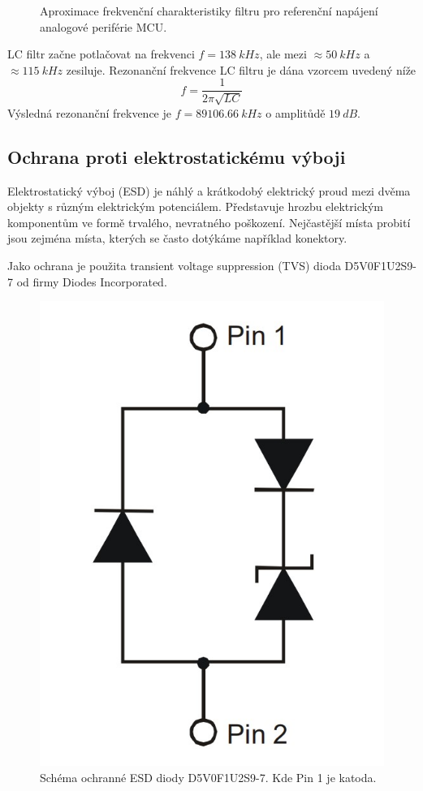 \begin{figure}[H]
    \caption{Aproximace frekvenční charakteristiky filtru pro referenční napájení analogové periférie MCU.}
    \label{fig:stm32_vref_response}
\end{figure}
LC filtr začne potlačovat na frekvenci $f = 138 \ kHz$, ale mezi $\approx 50 \ kHz$ a $ \approx 115 \ kHz$ zesiluje.
Rezonanční frekvence LC filtru je dána vzorcem uvedený níže
\begin{equation}
    f = \frac{1}{2 \pi \sqrt{LC}}
\end{equation}
Výsledná rezonanční frekvence je $f = 89106.66 \ kHz$ o amplitůdě $19 \ dB$.

\subsection{Ochrana proti elektrostatickému výboji}
Elektrostatický výboj (ESD) je náhlý a krátkodobý elektrický proud mezi dvěma objekty s různým elektrickým potenciálem. Představuje hrozbu elektrickým komponentům ve formě trvalého, nevratného poškození. Nejčastější místa probití jsou zejména místa, kterých se často dotýkáme například konektory.
\par
Jako ochrana je použita transient voltage suppression (TVS) dioda D5V0F1U2S9-7 od firmy Diodes Incorporated.

\begin{figure}[H]
    \centering
    \includegraphics[width=0.4\linewidth]{pictures/esd_diode_schema.jpg}
    \caption{Schéma ochranné ESD diody D5V0F1U2S9-7. Kde Pin 1 je katoda. \cite{cite:ESD}}
    \label{fig:esd_diode}
\end{figure}

